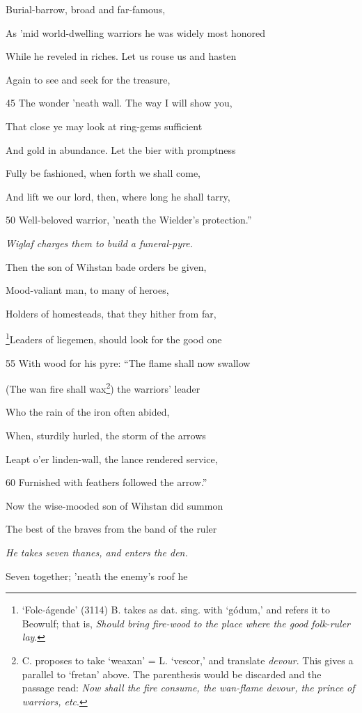 Burial-barrow, broad and far-famous,

As ’mid world-dwelling warriors he was widely most honored

While he reveled in riches. Let us rouse us and hasten

Again to see and seek for the treasure,

45
The wonder ’neath wall. The way I will show you,

That close ye may look at ring-gems sufficient

And gold in abundance. Let the bier with promptness

Fully be fashioned, when forth we shall come,

And lift we our lord, then, where long he shall tarry,

50
Well-beloved warrior, ’neath the Wielder’s protection.”

\emph{Wiglaf charges
them to build a
funeral-pyre.}

Then the son of Wihstan bade orders be given,

Mood-valiant man, to many of heroes,

Holders of homesteads, that they hither from far,

\footnote{‘Folc-ágende’ (3114) B. takes as dat. sing. with ‘gódum,’ and refers it to
Beowulf; that is, \emph{Should bring fire-wood to the place where the good folk-ruler
lay}.}Leaders of liegemen, should look for the good one

55
With wood for his pyre: “The flame shall now swallow

(The wan fire shall wax\footnote{C. proposes to take ‘weaxan’ = L. ‘vescor,’ and translate \emph{devour}. This
gives a parallel to ‘fretan’ above. The parenthesis would be discarded and
the passage read: \emph{Now shall the fire consume, the wan-flame devour, the
prince of warriors, etc}.}) the warriors’ leader

Who the rain of the iron often abided,

When, sturdily hurled, the storm of the arrows

Leapt o’er linden-wall, the lance rendered service,

60
Furnished with feathers followed the arrow.”

Now the wise-mooded son of Wihstan did summon

The best of the braves from the band of the ruler

\emph{He takes seven
thanes, and enters
the den.}

Seven together; ’neath the enemy’s roof he

